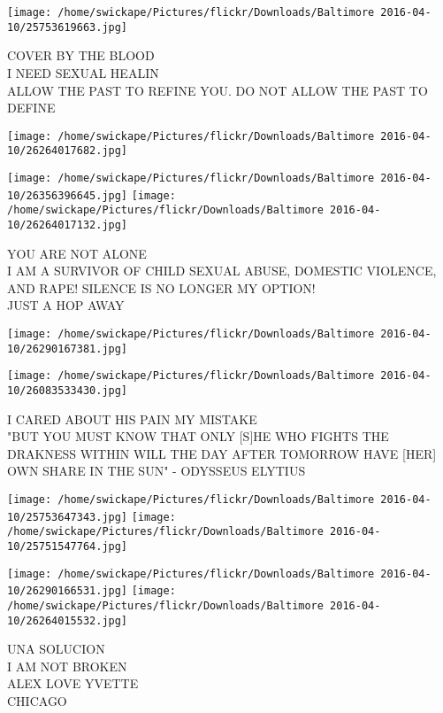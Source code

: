 \documentclass[10pt,letterpaper]{article}
\begin{document}
\vspace{0.25in}
\texttt{[image: /home/swickape/Pictures/flickr/Downloads/Baltimore 2016-04-10/25753619663.jpg]}

COVER BY THE BLOOD\\
I NEED SEXUAL HEALIN\\
ALLOW THE PAST TO REFINE YOU.  DO NOT ALLOW THE PAST TO DEFINE
\pagebreak

\texttt{[image: /home/swickape/Pictures/flickr/Downloads/Baltimore 2016-04-10/26264017682.jpg]}

\vspace{0.25in}
\texttt{[image: /home/swickape/Pictures/flickr/Downloads/Baltimore 2016-04-10/26356396645.jpg]}
\texttt{[image: /home/swickape/Pictures/flickr/Downloads/Baltimore 2016-04-10/26264017132.jpg]}

YOU ARE NOT ALONE\\
I AM A SURVIVOR OF CHILD SEXUAL ABUSE, DOMESTIC VIOLENCE, AND RAPE!  SILENCE IS NO LONGER MY OPTION!\\
JUST A HOP AWAY
\pagebreak

\texttt{[image: /home/swickape/Pictures/flickr/Downloads/Baltimore 2016-04-10/26290167381.jpg]}

\vspace{0.25in}
\texttt{[image: /home/swickape/Pictures/flickr/Downloads/Baltimore 2016-04-10/26083533430.jpg]}

I CARED ABOUT HIS PAIN MY MISTAKE\\
"BUT YOU MUST KNOW THAT ONLY {[}S{]}HE WHO FIGHTS THE DRAKNESS WITHIN WILL THE DAY AFTER TOMORROW HAVE {[}HER{]} OWN SHARE IN THE SUN" {-} ODYSSEUS ELYTIUS
\pagebreak

\texttt{[image: /home/swickape/Pictures/flickr/Downloads/Baltimore 2016-04-10/25753647343.jpg]}
\texttt{[image: /home/swickape/Pictures/flickr/Downloads/Baltimore 2016-04-10/25751547764.jpg]}

\texttt{[image: /home/swickape/Pictures/flickr/Downloads/Baltimore 2016-04-10/26290166531.jpg]}
\texttt{[image: /home/swickape/Pictures/flickr/Downloads/Baltimore 2016-04-10/26264015532.jpg]}

UNA SOLUCION\\
I AM NOT BROKEN\\
ALEX LOVE YVETTE\\
CHICAGO
\pagebreak
\end{document}
